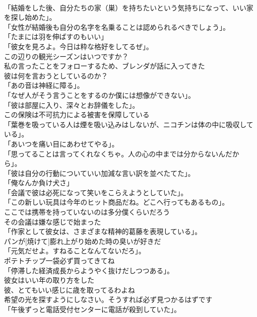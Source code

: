 \documentclass[8pt]{extreport}
\begin{document}
\begin{CJK}{UTF8}{min}
\\	「結婚をした後、自分たちの家（巣）を持ちたいという気持ちになって、いい家を探し始めた」。	
\\	「女性が結婚後も自分の名字を名乗ることは認められるべきでしょう」。	
\\	「たまには羽を伸ばすのもいい」	
\\	「彼女を見ろよ。今日は粋な格好をしてるぜ」。	
\\	この辺りの観光シーズンはいつですか？	
\\	私の言ったことをフォローするため、ブレンダが話に入ってきた	
\\	彼は何を言おうとしているのか？	
\\	「あの音は神経に障る」。	
\\	「なぜ人がそう言うことをするのか僕には想像ができない」。	
\\	「彼は部屋に入り、深々とお辞儀をした」。	
\\	この保険は不可抗力による被害を保障している	
\\	「葉巻を吸っている人は煙を吸い込みはしないが、ニコチンは体の中に吸収している」。	
\\	「あいつを痛い目にあわせてやる」。	
\\	「思ってることは言ってくれなくちゃ。人の心の中までは分からないんだから」。	
\\	「彼は自分の行動についていい加減な言い訳を並べたてた」。	
\\	「俺なんか負け犬さ」	
\\	「会議で彼は必死になって笑いをこらえようとしていた」。	
\\	「この新しい玩具は今年のヒット商品だね。どこへ行ってもあるもの」。	
\\	ここでは携帯を持っていないのは多分僕くらいだろう	
\\	その会議は嫌な感じで始まった	
\\	「作家として彼女は、さまざまな精神的葛藤を表現している」。	
\\	パンが[焼けて]膨れ上がり始めた時の臭いが好きだ	
\\	「元気だせよ。すねることなんてないだろ」。	
\\	ポテトチップ一袋必ず買ってきてね	
\\	「停滞した経済成長からようやく抜けだしつつある」。	
\\	彼女はいい年の取り方をした	
\\	彼、とてもいい感じに歳を取ってるわよね	
\\	希望の光を探すようにしなさい。そうすれば必ず見つかるはずです	
\\	「午後ずっと電話受付センターに電話が殺到していた」。	

\end{CJK}
\end{document}
